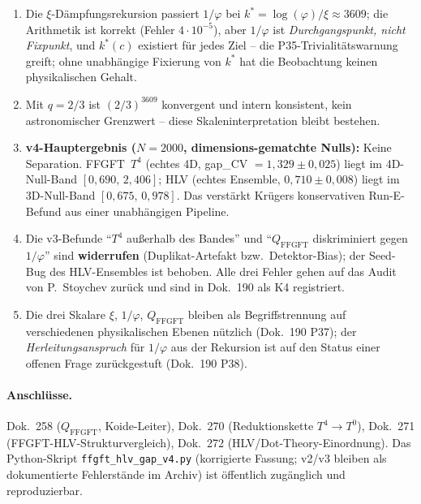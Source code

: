 \begin{enumerate}
  \item Die $\xi$-Dämpfungsrekursion passiert $1/\varphi$ bei
        $k^* = \log(\varphi)/\xi \approx 3609$; die Arithmetik ist
        korrekt (Fehler $4{\cdot}10^{-5}$), aber $1/\varphi$ ist
        \emph{Durchgangspunkt, nicht Fixpunkt}, und $k^*(c)$ existiert
        für jedes Ziel -- die P35-Trivialitätswarnung greift; ohne
        unabhängige Fixierung von $k^*$ hat die Beobachtung keinen
        physikalischen Gehalt.
  \item Mit $q = 2/3$ ist $(2/3)^{3609}$ konvergent und intern
        konsistent, kein astronomischer Grenzwert -- diese
        Skaleninterpretation bleibt bestehen.
  \item \textbf{v4-Hauptergebnis ($N=2000$, dimensions-gematchte
        Nulls):} Keine Separation. FFGFT~$T^4$ (echtes 4D,
        gap\_CV $=1{,}329\pm0{,}025$) liegt im 4D-Null-Band
        $[0{,}690,\,2{,}406]$; HLV (echtes Ensemble,
        $0{,}710\pm0{,}008$) liegt im 3D-Null-Band
        $[0{,}675,\,0{,}978]$. Das verstärkt Krügers konservativen
        Run-E-Befund aus einer unabhängigen Pipeline.
  \item Die v3-Befunde \enquote{$T^4$ außerhalb des Bandes} und
        \enquote{$Q_\mathrm{FFGFT}$ diskriminiert gegen $1/\varphi$}
        sind \textbf{widerrufen} (Duplikat-Artefakt bzw.\
        Detektor-Bias); der Seed-Bug des HLV-Ensembles ist behoben.
        Alle drei Fehler gehen auf das Audit von P.~Stoychev zurück
        und sind in Dok.~190 als K4 registriert.
  \item Die drei Skalare $\xi$, $1/\varphi$, $Q_\mathrm{FFGFT}$
        bleiben als Begriffstrennung auf verschiedenen physikalischen
        Ebenen nützlich (Dok.~190 P37); der \emph{Herleitungsanspruch}
        für $1/\varphi$ aus der Rekursion ist auf den Status einer
        offenen Frage zurückgestuft (Dok.~190 P38).
\end{enumerate}

\paragraph{Anschlüsse.}
Dok.~258 ($Q_\mathrm{FFGFT}$, Koide-Leiter), Dok.~270 (Reduktionskette
$T^4\to T^0$), Dok.~271 (FFGFT-HLV-Strukturvergleich), Dok.~272
(HLV/Dot-Theory-Einordnung). Das Python-Skript
\texttt{ffgft\_hlv\_gap\_v4.py} (korrigierte Fassung; v2/v3 bleiben
als dokumentierte Fehlerstände im Archiv) ist öffentlich zugänglich
und reproduzierbar.

